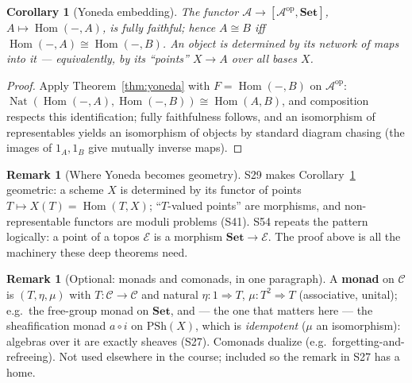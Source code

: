 \documentclass[11pt,a4paper]{article}
\newtheorem{corollary}[theorem]{Corollary}
\theoremstyle{definition}
\newtheorem{remark}[theorem]{Remark}
\newcommand{\Hom}{\operatorname{Hom}}
\newcommand{\Nat}{\operatorname{Nat}}
\newcommand{\Set}{\mathbf{Set}}
\begin{document}
\begin{corollary}[Yoneda embedding]\label{cor:yoneda-emb}
The functor $\mathcal A\to[\mathcal A^{\mathrm{op}},\Set]$, $A\mapsto\Hom(-,A)$, is fully faithful;
hence $A\cong B$ iff $\Hom(-,A)\cong\Hom(-,B)$. An object is determined by its network of maps
into it --- equivalently, by its ``points'' $X\to A$ over all bases $X$.
\end{corollary}
\begin{proof}
Apply Theorem~\ref{thm:yoneda} with $F=\Hom(-,B)$ on $\mathcal A^{\mathrm{op}}$: 
$\Nat(\Hom(-,A),\Hom(-,B))\cong\Hom(A,B)$, and composition respects this identification; fully
faithfulness follows, and an isomorphism of representables yields an isomorphism of objects by
standard diagram chasing (the images of $1_A,1_B$ give mutually inverse maps).
\end{proof}

\begin{remark}[Where Yoneda becomes geometry]
S29 makes Corollary~\ref{cor:yoneda-emb} geometric: a scheme $X$ is determined by its functor of
points $T\mapsto X(T)=\Hom(T,X)$; ``$T$-valued points'' are morphisms, and non-representable functors
are moduli problems (S41). S54 repeats the pattern logically: a point of a topos $\mathcal E$ is a
morphism $\Set\to\mathcal E$. The proof above is all the machinery these deep theorems need.
\end{remark}

\begin{remark}[Optional: monads and comonads, in one paragraph]
A \textbf{monad} on $\mathcal C$ is $(T,\eta,\mu)$ with $T:\mathcal C\to\mathcal C$ and natural
$\eta:1\Rightarrow T$, $\mu:T^2\Rightarrow T$ (associative, unital); e.g.\ the free-group monad on
$\Set$, and --- the one that matters here --- the sheafification monad $a\circ i$ on
$\mathrm{PSh}(X)$, which is \emph{idempotent} ($\mu$ an isomorphism): algebras over it are exactly
sheaves (S27). Comonads dualize (e.g.\ forgetting-and-refreeing). Not used elsewhere in the course;
included so the remark in S27 has a home.
\end{remark}

\end{document}
